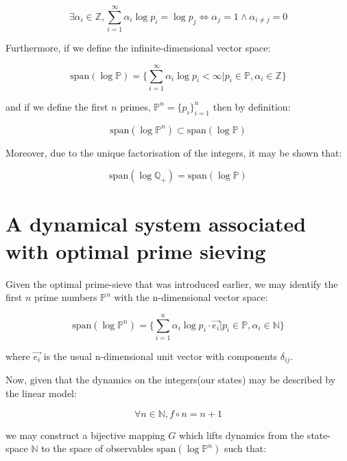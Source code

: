 \documentclass{article}
\begin{document}
\begin{equation}
\exists \alpha_i \in \mathbb{Z}, \sum_{i=1}^\infty \alpha_i \log p_i = \log p_j \iff \alpha_j = 1 \land \alpha_{i \neq j} = 0
\end{equation}

Furthermore, if we define the infinite-dimensional vector space:

\begin{equation}
\text{span}(\log \mathbb{P}) = \Big\{\sum_{i=1}^\infty \alpha_i \log p_i < \infty \lvert p_i \in \mathbb{P}, \alpha_i \in \mathbb{Z}\Big\}
\end{equation}

and if we define the first $n$ primes, $\mathbb{P}^n = \{p_i\}_{i=1}^n$ then by definition:

\begin{equation}
\text{span}(\log \mathbb{P}^n) \subset \text{span}(\log \mathbb{P})
\end{equation}

Moreover, due to the unique factorisation of the integers, it may be shown that:

\begin{equation}
\text{span}(\log \mathbb{Q}_+) = \text{span}(\log \mathbb{P})
\end{equation}

\section{A dynamical system associated with optimal prime sieving}

Given the optimal prime-sieve that was introduced earlier, we may identify the first $n$ prime numbers $\mathbb{P}^n$
with the n-dimensional vector space:

\begin{equation}
\text{span}(\log \mathbb{P}^n) = \Big\{\sum_{i=1}^n \alpha_i \log p_i \cdot \vec{e_i}  \lvert p_i \in \mathbb{P}, \alpha_i \in \mathbb{N}\Big\}
\end{equation}

where $\vec{e_i}$ is the usual n-dimensional unit vector with components $\delta_{ij}$.

Now, given that the dynamics on the integers(our states) may be described by the linear model:

\begin{equation}
\forall n \in \mathbb{N}, f \circ n = n+1
\end{equation}

we may construct a bijective mapping $G$ which lifts dynamics from the state-space $\mathbb{N}$ to the space of observables $\text{span}(\log \mathbb{P}^n)$ such that:
\end{document}
